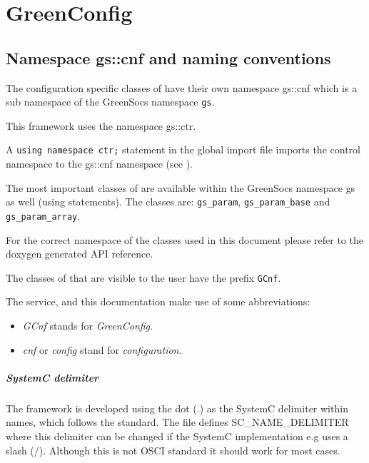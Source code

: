
\cleardoublepage
\chapter{GreenConfig}
\label{GreenConfig}

\section{Namespace gs::cnf and naming conventions}
The configuration specific classes of \GreenConfig have their own namespace {\sffamily gs::cnf} which is a sub namespace of the GreenSocs namespace \lstinline|gs|.

This framework uses the \GreenControl namespace {\sffamily gs::ctr}.

A \lstinline[language=TeX]|using namespace ctr;| statement in the \GreenConfig global import file imports the control namespace to the {\sffamily gs::cnf} namespace (see ).

The most important classes of \GreenConfig are available within the GreenSocs namespace {\sffamily gs} as well (using statements). The classes are: \lstinline|gs_param|, \lstinline|gs_param_base| and \lstinline|gs_param_array|.


For the correct namespace of the classes used in this document please
refer to the doxygen generated API reference.

The classes of \GreenConfig that are visible to the user have the prefix \lstinline|GCnf|.

The \GreenConfig service, and this documentation make use of some abbreviations:
\begin{itemize}
	\item \emph{GCnf} stands for {\em GreenConfig}.
	\item \emph{cnf} or \emph{config} stand for {\em configuration}.
\end{itemize}

\paragraph{SystemC delimiter} The \GreenConfig framework is developed using the dot ({\sffamily .}) as the SystemC delimiter within names, which follows the standard. The file  defines {\sffamily SC\_NAME\_DELIMITER} where this delimiter can be changed if the SystemC implementation e.g uses a slash ({\sffamily /}). Although this is not OSCI standard it should work for most cases.

